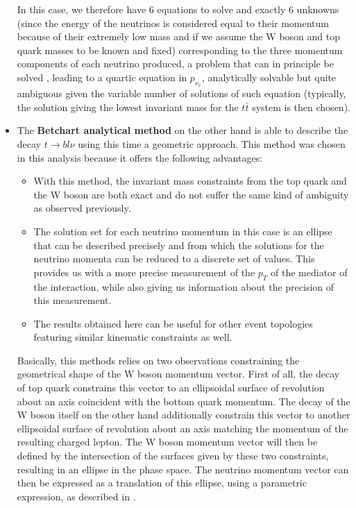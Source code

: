 \documentclass[a4paper, 10pt, openright]{report}
\begin{document}
\begin{itemize}
In this case, we therefore have 6 equations to solve and exactly 6 unknowns (since the energy of the neutrinos is considered equal to their momentum because of their extremely low mass and if we assume the W boson and top quark masses to be known and fixed) corresponding to the three momentum components of each neutrino produced, a problem that can in principle be solved \cite{TopReco}, leading to a quartic equation in $p_{\nu_x}$, analytically solvable but quite ambiguous given the variable number of solutions of such equation (typically, the solution giving the lowest invariant mass for the $t \bar t$ system is then chosen).


\item The \textbf{Betchart analytical method} on the other hand is able to describe the decay $t \rightarrow bl\nu$ using this time a geometric approach. This method was chosen in this analysis because it offers the following advantages:
\begin{itemize}
\item With this method, the invariant mass constraints from the top quark and the W boson are both exact and do not suffer the same kind of ambiguity as observed previously. 
\item The solution set for each neutrino momentum in this case is an ellipse that can be described precisely and from which the solutions for the neutrino momenta can be reduced to a discrete set of values. This provides us with a more precise measurement of the $p_T$ of the mediator of the interaction, while also giving us information about the precision of this measurement.
\item The results obtained here can be useful for other event topologies featuring similar kinematic constraints as well.
\end{itemize}

Basically, this methods relies on two observations constraining the geometrical shape of the W boson momentum vector. First of all, the decay of top quark constrains this vector to an ellipsoidal surface of revolution about an axis coincident with the bottom quark momentum. The decay of the W boson itself on the other hand additionally constrain this vector to another ellipsoidal surface of revolution about an axis matching the momentum of the resulting charged lepton. The W boson momentum vector will then be defined by the intersection of the surfaces given by these two constraints, resulting in an ellipse in the phase space. The neutrino momentum vector can then be expressed as a translation of this ellipse, using a parametric expression, as described in \cite{Betchart}.


\end{itemize}
\end{document}
